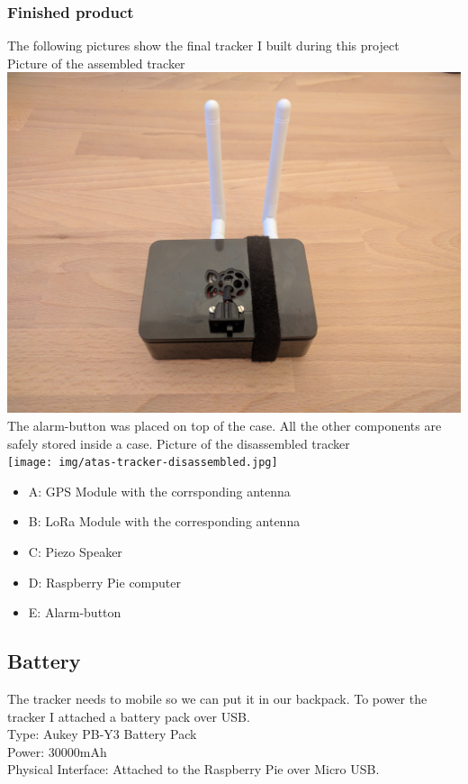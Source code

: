 \documentclass[a4paper,11pt, oneside]{report}
\theoremstyle{definition}
\begin{document}
\subsubsection{Finished product}
The following pictures show the final tracker I built during this project\\[0.3cm]
Picture of the assembled tracker\\[0.3cm]
\includegraphics[width=\textwidth]{img/atas-tracker-assembled.jpg}
The alarm-button was placed on top of the case. All the other components are safely stored inside a case.
\newpage
\noindent
Picture of the disassembled tracker\\[0.3cm]
\texttt{[image: img/atas-tracker-disassembled.jpg]}
\begin{itemize}
\item A: GPS Module with the corrsponding antenna
\item B: LoRa Module with the corresponding antenna
\item C: Piezo Speaker
\item D: Raspberry Pie computer
\item E: Alarm-button
\end{itemize}

\newpage
\subsection{Battery}
The tracker needs to mobile so we can put it in our backpack. To power the tracker I attached a battery pack over USB.\\[0.3cm]
Type: Aukey PB-Y3 Battery Pack\\
Power: 30000mAh\\
Physical Interface: Attached to the Raspberry Pie over Micro USB.
\end{document}
